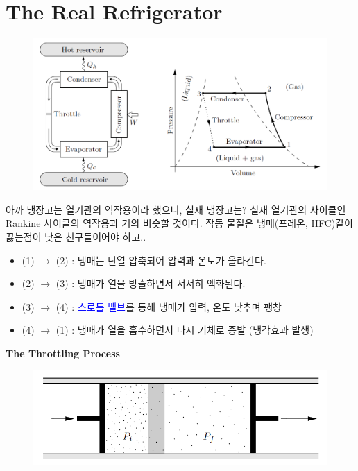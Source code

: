\documentclass{article}
\begin{document}
\newpage

\section{The Real Refrigerator}

\begin{figure}[h]
    \centering
    \includegraphics[width=0.75\linewidth]{images/fig4_1.png}
\end{figure}

아까 냉장고는 열기관의 역작용이라 했으니, 실재 냉장고는? 실재 열기관의 사이클인 Rankine 사이클의 역작용과 거의 비슷할 것이다. 작동 물질은 냉매(프레온, HFC)같이 끓는점이 낮은 친구들이어야 하고..
\begin{itemize}
    \item (1) $\rightarrow$ (2) : 냉매는 단열 압축되어 압력과 온도가 올라간다.
    \item (2) $\rightarrow$ (3) : 냉매가 열을 방출하면서 서서히 액화된다.
    \item (3) $\rightarrow$ (4) : \textcolor{blue}{스로틀 밸브}를 통해 냉매가 압력, 온도 낮추며 팽창
    \item (4) $\rightarrow$ (1) : 냉매가 열을 흡수하면서 다시 기체로 증발 (냉각효과 발생)
\end{itemize}

\noindent
\textbf{The Throttling Process}

\begin{figure}[h]
    \centering
    \includegraphics[width=0.55\linewidth]{images/fig4_2.png}
\end{figure}
\end{document}

